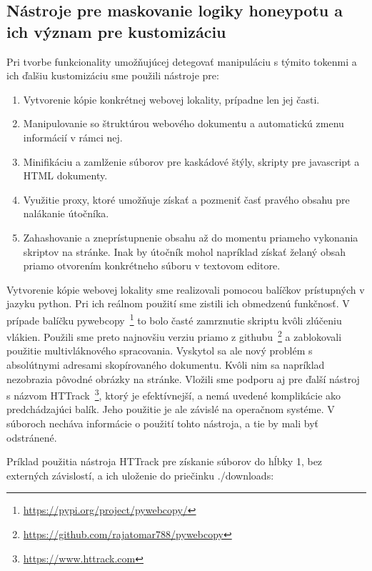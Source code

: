 \documentclass[conference, 11pt,slovak,a4paper,twoside]{IEEEtran}
\begin{document}
\subsection{Nástroje pre maskovanie logiky honeypotu a ich význam pre kustomizáciu} \label{toolsForConcealingCustomization}

Pri tvorbe funkcionality umožňujúcej detegovať manipuláciu s týmito tokenmi a ich ďalšiu kustomizáciu sme použili nástroje pre:

\begin{enumerate}
	\item Vytvorenie kópie konkrétnej webovej lokality, prípadne len jej časti. 

	\item Manipulovanie so štruktúrou webového dokumentu a automatickú zmenu informácií v rámci nej.
	
	\item Minifikáciu a zamlženie súborov pre kaskádové štýly, skripty pre javascript a HTML dokumenty. 

	\item Využitie proxy, ktoré umožňuje získať a pozmeniť časť pravého obsahu pre nalákanie útočníka.
	
	\item Zahashovanie a zneprístupnenie obsahu až do momentu priameho vykonania skriptov na stránke. Inak by útočník mohol napríklad získať želaný obsah priamo otvorením konkrétneho súboru v textovom editore.
\end{enumerate}

Vytvorenie kópie webovej lokality sme realizovali pomocou balíčkov prístupných v jazyku python. Pri ich reálnom použití sme zistili ich obmedzenú funkčnosť. V prípade balíčku pywebcopy~\footnote{\url{https://pypi.org/project/pywebcopy/}} to bolo časté zamrznutie skriptu kvôli zlúčeniu vlákien. Použili sme preto najnovšiu verziu priamo z githubu~\footnote{\url{https://github.com/rajatomar788/pywebcopy}} a zablokovali použitie multivláknového spracovania. Vyskytol sa ale nový problém s absolútnymi adresami skopírovaného dokumentu. Kvôli nim sa napríklad nezobrazia pôvodné obrázky na stránke. Vložili sme podporu aj pre ďalší nástroj s názvom HTTrack~\footnote{\url{https://www.httrack.com}}, ktorý je efektívnejší, a nemá uvedené komplikácie ako predchádzajúci balík. Jeho použitie je ale závislé na operačnom systéme. V súboroch necháva informácie o použití tohto nástroja, a tie by mali byť odstránené.

Príklad použitia nástroja HTTrack pre získanie súborov do hĺbky 1, bez externých závislostí, a ich uloženie do priečinku ./downloads:
\end{document}
